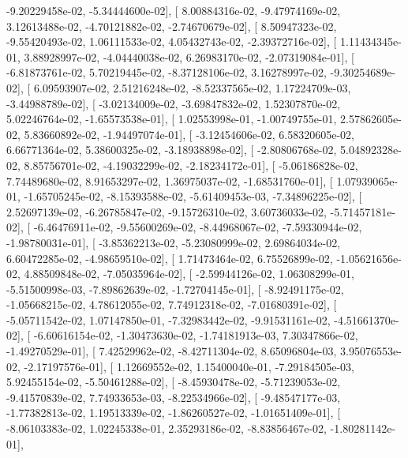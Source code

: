 \documentclass{article}
\begin{document}
         -9.20229458e-02,  -5.34444600e-02],
       [  8.00884316e-02,  -9.47974169e-02,   3.12613488e-02,
         -4.70121882e-02,  -2.74670679e-02],
       [  8.50947323e-02,  -9.55420493e-02,   1.06111533e-02,
          4.05432743e-02,  -2.39372716e-02],
       [  1.11434345e-01,   3.88928997e-02,  -4.04440038e-02,
          6.26983170e-02,  -2.07319084e-01],
       [ -6.81873761e-02,   5.70219445e-02,  -8.37128106e-02,
          3.16278997e-02,  -9.30254689e-02],
       [  6.09593907e-02,   2.51216248e-02,  -8.52337565e-02,
          1.17224709e-03,  -3.44988789e-02],
       [ -3.02134009e-02,  -3.69847832e-02,   1.52307870e-02,
          5.02246764e-02,  -1.65573538e-01],
       [  1.02553998e-01,  -1.00749755e-01,   2.57862605e-02,
          5.83660892e-02,  -1.94497074e-01],
       [ -3.12454606e-02,   6.58320605e-02,   6.66771364e-02,
          5.38600325e-02,  -3.18938898e-02],
       [ -2.80806768e-02,   5.04892328e-02,   8.85756701e-02,
         -4.19032299e-02,  -2.18234172e-01],
       [ -5.06186828e-02,   7.74489680e-02,   8.91653297e-02,
          1.36975037e-02,  -1.68531760e-01],
       [  1.07939065e-01,  -1.65705245e-02,  -8.15393588e-02,
         -5.61409453e-03,  -7.34896225e-02],
       [  2.52697139e-02,  -6.26785847e-02,  -9.15726310e-02,
          3.60736033e-02,  -5.71457181e-02],
       [ -6.46476911e-02,  -9.55600269e-02,  -8.44968067e-02,
         -7.59330944e-02,  -1.98780031e-01],
       [ -3.85362213e-02,  -5.23080999e-02,   2.69864034e-02,
          6.60472285e-02,  -4.98659510e-02],
       [  1.71473464e-02,   6.75526899e-02,  -1.05621656e-02,
          4.88509848e-02,  -7.05035964e-02],
       [ -2.59944126e-02,   1.06308299e-01,  -5.51500998e-03,
         -7.89862639e-02,  -1.72704145e-01],
       [ -8.92491175e-02,  -1.05668215e-02,   4.78612055e-02,
          7.74912318e-02,  -7.01680391e-02],
       [ -5.05711542e-02,   1.07147850e-01,  -7.32983442e-02,
         -9.91531161e-02,  -4.51661370e-02],
       [ -6.60616154e-02,  -1.30473630e-02,  -1.74181913e-03,
          7.30347866e-02,  -1.49270529e-01],
       [  7.42529962e-02,  -8.42711304e-02,   8.65096804e-03,
          3.95076553e-02,  -2.17197576e-01],
       [  1.12669552e-02,   1.15400040e-01,  -7.29184505e-03,
          5.92455154e-02,  -5.50461288e-02],
       [ -8.45930478e-02,  -5.71239053e-02,  -9.41570839e-02,
          7.74933653e-03,  -8.22534966e-02],
       [ -9.48547177e-03,  -1.77382813e-02,   1.19513339e-02,
         -1.86260527e-02,  -1.01651409e-01],
       [ -8.06103383e-02,   1.02245338e-01,   2.35293186e-02,
         -8.83856467e-02,  -1.80281142e-01],
\end{document}
